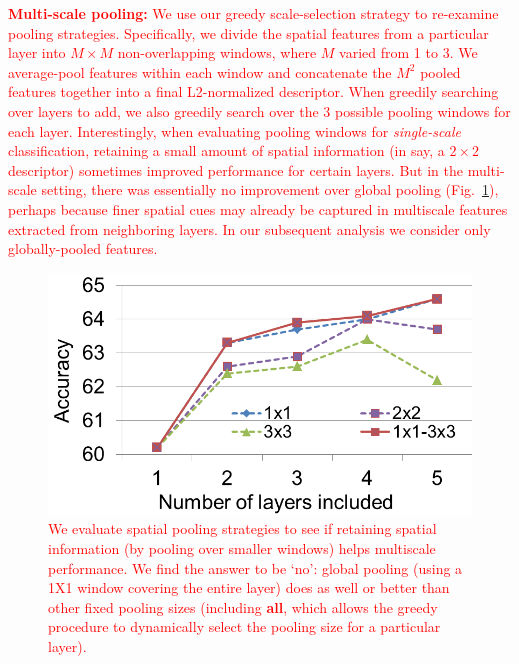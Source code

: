 \documentclass[10pt,twocolumn,letterpaper]{article}
\newcommand{\new}[1]{\textcolor{red}{#1}}
\begin{document}
\new{{\bf Multi-scale pooling:} We use our greedy scale-selection strategy to re-examine pooling strategies. Specifically, we divide the spatial features from a particular layer into $M \times M$ non-overlapping windows, where $M$ varied from 1 to 3. We average-pool features within each window and concatenate the $M^2$ pooled features together into a final L2-normalized descriptor. When greedily searching over layers to add, we also greedily search over the 3 possible pooling windows for each layer. Interestingly, when evaluating pooling windows for {\em single-scale} classification, retaining a small amount of spatial information (in say, a $2 \times 2$ descriptor) sometimes improved performance for certain layers. But in the multi-scale setting, there was essentially no improvement over global pooling (Fig.~\ref{fig:pool_size}), perhaps because finer spatial cues may already be captured in multiscale features extracted from neighboring layers. %
In our subsequent analysis we consider only globally-pooled features.}

\begin{figure}[t!]
\centering
\includegraphics[width=.5\columnwidth]{fig/sumpool_size.png}

\caption{\new{We evaluate spatial pooling strategies to see if retaining spatial information (by pooling over smaller windows) helps multiscale performance. We find the answer to be `no': global pooling (using a 1X1 window covering the entire layer) does as well or better than other fixed pooling sizes (including {\bf all}, which allows the greedy procedure to dynamically select the pooling size for a particular layer).}}
\label{fig:pool_size}
\end{figure}
\end{document}
